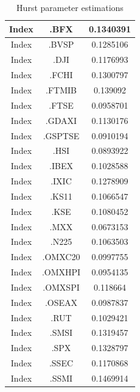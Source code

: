 \begin{table}[htbp]
\begin{tabular}{|c|c|c|}
                Index                    & .BFX & 0.1340391 \\ \hline
                Index                    & .BVSP & 0.1285106 \\ \hline
                Index                    & .DJI & 0.1176993 \\ \hline
                Index                    & .FCHI & 0.1300797 \\ \hline
                Index                    & .FTMIB & 0.139092 \\ \hline
                Index                    & .FTSE & 0.0958701 \\ \hline
                Index                    & .GDAXI & 0.1130176 \\ \hline
                Index                    & .GSPTSE & 0.0910194 \\ \hline
                Index                    & .HSI & 0.0893922 \\ \hline
                Index                    & .IBEX & 0.1028588 \\ \hline
                Index                    & .IXIC & 0.1278909 \\ \hline
                Index                    & .KS11 & 0.1066547 \\ \hline
                Index                    & .KSE & 0.1080452 \\ \hline
                Index                    & .MXX & 0.0673153 \\ \hline
                Index                    & .N225 & 0.1063503 \\ \hline
                Index                    & .OMXC20 & 0.0997755 \\ \hline
                Index                    & .OMXHPI & 0.0954135 \\ \hline
                Index                    & .OMXSPI & 0.118664 \\ \hline
                Index                    & .OSEAX & 0.0987837 \\ \hline
                Index                    & .RUT & 0.1029421 \\ \hline
                Index                    & .SMSI & 0.1319457 \\ \hline
                Index                    & .SPX & 0.1328797 \\ \hline
                Index                    & .SSEC & 0.1170868 \\ \hline
                Index                    & .SSMI & 0.1469914 \\ \hline
            \end{tabular}
            \caption{Hurst parameter estimations}
            \label{table:hurst_est}
        \end{table}



